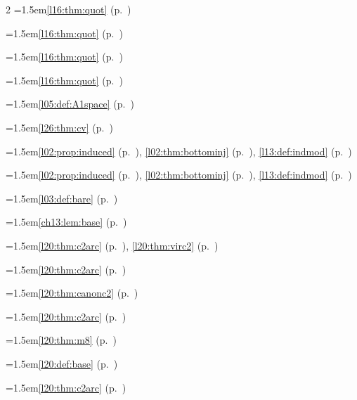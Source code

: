 \begin{multicols}{2}
\hangindent=1.5em\quad \ref{l16:thm:quot} (p.~\pageref{l16:thm:quot})\par
\hangindent=1.5em\quad \ref{l16:thm:quot} (p.~\pageref{l16:thm:quot})\par
\hangindent=1.5em\quad \ref{l16:thm:quot} (p.~\pageref{l16:thm:quot})\par
\hangindent=1.5em\quad \ref{l16:thm:quot} (p.~\pageref{l16:thm:quot})\par
\par{}\par\nopagebreak\smallskip
\hangindent=1.5em\quad \ref{l05:def:A1space} (p.~\pageref{l05:def:A1space})\par
\hangindent=1.5em\quad \ref{l26:thm:cv} (p.~\pageref{l26:thm:cv})\par
\hangindent=1.5em\quad \ref{l02:prop:induced} (p.~\pageref{l02:prop:induced}), \ref{l02:thm:bottominj} (p.~\pageref{l02:thm:bottominj}), \ref{l13:def:indmod} (p.~\pageref{l13:def:indmod})\par
\hangindent=1.5em\quad \ref{l02:prop:induced} (p.~\pageref{l02:prop:induced}), \ref{l02:thm:bottominj} (p.~\pageref{l02:thm:bottominj}), \ref{l13:def:indmod} (p.~\pageref{l13:def:indmod})\par
\hangindent=1.5em\quad \ref{l03:def:bare} (p.~\pageref{l03:def:bare})\par
\hangindent=1.5em\quad \ref{ch13:lem:base} (p.~\pageref{ch13:lem:base})\par
\hangindent=1.5em\quad \ref{l20:thm:c2arc} (p.~\pageref{l20:thm:c2arc}), \ref{l20:thm:virc2} (p.~\pageref{l20:thm:virc2})\par
\hangindent=1.5em\quad \ref{l20:thm:c2arc} (p.~\pageref{l20:thm:c2arc})\par
\hangindent=1.5em\quad \ref{l20:thm:canonc2} (p.~\pageref{l20:thm:canonc2})\par
\hangindent=1.5em\quad \ref{l20:thm:c2arc} (p.~\pageref{l20:thm:c2arc})\par
\hangindent=1.5em\quad \ref{l20:thm:m8} (p.~\pageref{l20:thm:m8})\par
\hangindent=1.5em\quad \ref{l20:def:base} (p.~\pageref{l20:def:base})\par
\hangindent=1.5em\quad \ref{l20:thm:c2arc} (p.~\pageref{l20:thm:c2arc})\par

\end{multicols}
